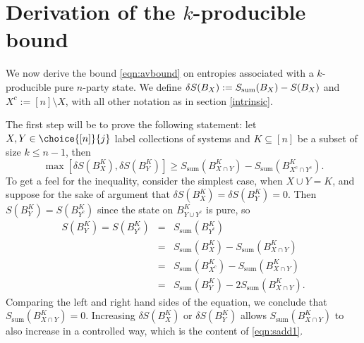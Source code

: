 \documentclass[12pt]{article}
\newcommand{\be}{\begin{equation}}
\newcommand{\ee}{\end{equation}}
\newcommand{\beq}{\begin{eqnarray}}
\newcommand{\eeq}{\end{eqnarray}}
\def\Sadd{{S_{\text{sum}}}}
\numberwithin{equation}{section}
\begin{document}
\section{Derivation of the $k$-producible bound}
\label{bound}

We now derive the bound \eqref{eqn:avbound} on entropies associated with a $k$-producible pure $n$-party state.
We define $\delta S(B_X) := S_{\rm{sum}}(B_X) - S(B_X)$ and $X^c := [n] \setminus X$, with all other notation as in section \ref{intrinsic}.

The first step will be to prove the following statement: let $X, Y \in \choice{[n]}{j}$ label collections of systems
and $K \subseteq [n]$ be a subset of size $k \leq n-1$, then
\be
\max\left[ \delta S(B_X^K), \delta S(B_Y^K) \right]
	\geq \Sadd( B_{X \cap Y }^K ) - \Sadd( B_{X^c \cap Y^c}^K ). \label{eqn:sadd1}
\ee
To get a feel for the inequality, consider the simplest case, when $X \cup Y = K$, and suppose for the sake of argument that $\delta S(B_X^K) = \delta S(B_Y^K) = 0$. Then
$S(B_Y^K) = S(B_{Y^c}^K)$ since the state on $B_{Y \cup Y^c}^K$ is pure, so
\beq
S( B_Y^K )
=
S(B_{Y^c}^K)
&=&
\Sadd (B_{Y^c}^K) \\
&=&
\Sadd (B_X^K) - \Sadd (B_{X \cap Y}^K) \\
&=&
\Sadd(B_{X^c}^K) - \Sadd (B_{X \cap Y}^K) \\
&=&
\Sadd( B_Y^K ) - 2 \Sadd( B_{X \cap Y}^K).
\eeq
Comparing the left and right hand sides of the equation, we conclude that $\Sadd( B_{X \cap Y}^K)=0$. Increasing $\delta S(B_X^K)$ or $\delta S(B_Y^K)$ allows $\Sadd( B_{X \cap Y}^K)$ to also increase in a controlled way, which is the content of \eqref{eqn:sadd1}.
\end{document}
